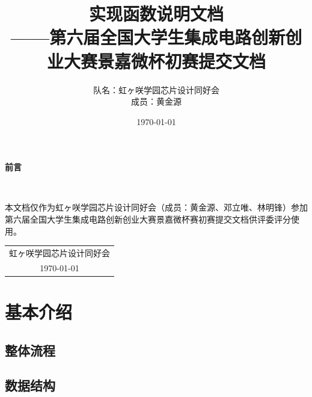 \documentclass[12pt, a4paper, oneside]{ctexbook}
\title{{\Huge{\textbf{实现函数说明文档}}}\normalsize{\\——第六届全国大学生集成电路创新创业大赛景嘉微杯初赛提交文档}}
\author{队名：虹ヶ咲学园芯片设计同好会\\ 成员：黄金源\space邓立唯\space林明锋}
\date{\today}
\begin{document}
	
	\maketitle	
	\setcounter{page}{1}
	\begin{center}
		\Huge\textbf{前言}
	\end{center}~\

本文档仅作为虹ヶ咲学园芯片设计同好会（成员：黄金源、邓立唯、林明锋）参加第六届全国大学生集成电路创新创业大赛景嘉微杯赛初赛提交文档供评委评分使用。
	~\\
	\begin{flushright}
		\begin{tabular}{c}
			虹ヶ咲学园芯片设计同好会\\
			\today
		\end{tabular}
	\end{flushright}
	\newpage
	\setcounter{page}{1}
	\tableofcontents
	\newpage
	\setcounter{page}{1}
	
	\chapter{基本介绍}
	\section{整体流程}
	\section{数据结构}
\end{document}
